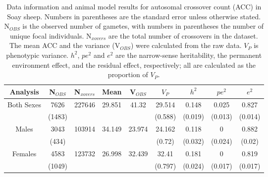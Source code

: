 \documentclass[a4paper,11pt]{article}
\begin{document}
\pagebreak

\begin{table}[H]
	\captionsetup{width=.9\textwidth}
	\caption{Data information and animal model results for autosomal crossover count (ACC) in Soay sheep. Numbers in parentheses are the standard error unless otherwise stated. N$_{OBS}$ is the observed number of gametes, with numbers in parentheses the number of unique focal individuals. N$_{xovers}$ are the total number of crossovers in the dataset. The mean ACC and the variance (V$_{OBS}$) were calculated from the raw data. $V_{P}$ is phenotypic variance. $h^{2}$, $pe^{2}$ and $e^{2}$ are the narrow-sense heritability, the permanent environment effect, and the residual effect, respectively; all are calculated as the proportion of $V_{P}$.}
	\centering
	
	\setlength{\extrarowheight}{.5em}
	\begin{tabular}{ccccccccc}
		\hline
		Analysis & N$_{OBS}$ &  N$_{xovers}$ & Mean & V$_{OBS}$ & $V_{P}$ & $h^{2}$ & $pe^{2}$ & $e^{2}$ \\ 		\hline
		
		Both Sexes	&	7626	&	227646	&	29.851	&	41.32	&	29.514	&	0.148	&	0.025	&	0.827	\\
		&	(1483)	&		&		&		&	(0.588)	&	(0.019)	&	(0.013)	&	(0.014)	\\
		Males	&	3043	&	103914	&	34.149	&	23.974	&	24.162	&	0.118	&	0	&	0.882	\\
		&	(434)	&		&		&		&	(0.72)	&	(0.032)	&	(0.024)	&	(0.02)	\\
		Females	&	4583	&	123732	&	26.998	&	32.439	&	32.41	&	0.181	&	0	&	0.819	\\
		&	(1049)	&		&		&		&	(0.797)	&	(0.024)	&	(0.017)	&	(0.017)	\\
		
		\hline
		
	\end{tabular}
	
	\label{tbl:Heritability}
\end{table}

\pagebreak
\end{document}
